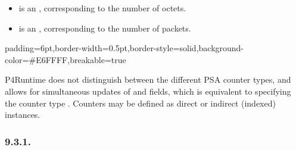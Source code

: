 \documentclass[11pt]{article}
\begin{document}
{%
\begin{itemize}[noitemsep,topsep=\mdcompacttopsep]%

\item{} is an , corresponding to the number of octets.%

\item{} is an , corresponding to the number of packets.%
\end{itemize}%

\begin{mdbmargintb}{6pt}{6pt}%
\begin{mdblock}{padding=6pt,border-width=0.5pt,border-style=solid,background-color=\#E6FFFF,breakable=true}%
\begin{mdpre}%
\end{mdpre}%
\end{mdblock}%
\end{mdbmargintb}%

\noindent{}P4Runtime does not distinguish between the different PSA counter types, and
allows for simultaneous updates of  and  fields, which
is equivalent to specifying the counter type . Counters may
be defined as direct or indirect (indexed) instances.%

\subsubsection{9.3.1.\hspace*{0.5em}}\label{sec-directcounterentry}%

}
\end{document}
